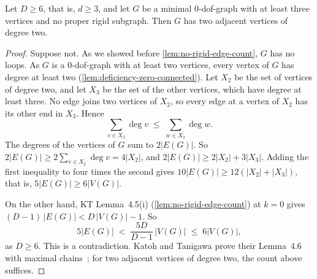 \begin{lemma}
  \label{lem:adjacent-degree-two-pair}
  \leanok
  Let $D \ge 6$, that is, $d \ge 3$, and let $G$ be a minimal
  $0$-dof-graph with at least three vertices and no proper rigid
  subgraph. Then $G$ has two adjacent vertices of degree two.
\end{lemma}
\begin{proof}
  \leanok
  Suppose not. As we showed before \cref{lem:no-rigid-edge-count}, $G$
  has no loops. As $G$ is a $0$-dof-graph with at least two vertices,
  every vertex of $G$ has degree at least two
  (\cref{lem:deficiency-zero-connected}).
  Let $X_2$ be the set of vertices of degree two, and let $X_3$ be the
  set of the other vertices, which have degree at least three. No edge
  joins two vertices of $X_2$, so every edge at a vertex of $X_2$ has its
  other end in $X_3$. Hence
  \[
    \sum_{v \in X_2} \deg v \;\le\; \sum_{w \in X_3} \deg w.
  \]
  The degrees of the vertices of $G$ sum to $2|E(G)|$. So
  $2|E(G)| \ge 2\sum_{v \in X_2} \deg v = 4|X_2|$, and
  $2|E(G)| \ge 2|X_2| + 3|X_3|$. Adding the first inequality to four
  times the second gives $10|E(G)| \ge 12(|X_2| + |X_3|)$, that is,
  $5|E(G)| \ge 6|V(G)|$.

  On the other hand, KT Lemma~4.5(i) (\cref{lem:no-rigid-edge-count}) at
  $k = 0$ gives $(D-1)\,|E(G)| < D\,|V(G)| - 1$. So
  \[
    5|E(G)| \;<\; \frac{5D}{D-1}\,|V(G)| \;\le\; 6|V(G)|,
  \]
  as $D \ge 6$. This is a contradiction. Katoh and Tanigawa prove their
  Lemma~4.6 with maximal chains~\cite[pp.~664--665]{katohTanigawa2011};
  for two adjacent vertices of degree two, the count above suffices.
\end{proof}

